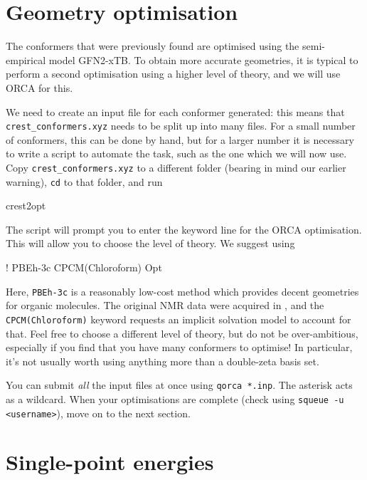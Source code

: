 \documentclass[10pt]{article}
\begin{document}
\section{Geometry optimisation}

The conformers that were previously found are optimised using the semi-empirical model GFN2-xTB.\autocite{Bannwarth2019} To obtain more accurate geometries, it is typical to perform a second optimisation using a higher level of theory, and we will use ORCA for this.

We need to create an input file for each conformer generated: this means that \texttt{crest\_conformers.xyz} needs to be split up into many files. For a small number of conformers, this can be done by hand, but for a larger number it is necessary to write a script to automate the task, such as the one which we will now use. Copy \texttt{crest\_conformers.xyz} to a different folder (bearing in mind our earlier warning), \texttt{cd} to that folder, and run

\begin{cmdline}
crest2opt
\end{cmdline}

The script will prompt you to enter the keyword line for the ORCA optimisation. This will allow you to choose the level of theory. We suggest using 

\begin{cmdline}
! PBEh-3c CPCM(Chloroform) Opt
\end{cmdline}

Here, \texttt{PBEh-3c} is a reasonably low-cost method which provides decent geometries for organic molecules. The original NMR data\autocite{Sun2013} were acquired in , and the \texttt{CPCM(Chloroform)} keyword requests an implicit solvation model to account for that. Feel free to choose a different level of theory, but do not be over-ambitious, especially if you find that you have many conformers to optimise! In particular, it's not usually worth using anything more than a double-zeta basis set.

You can submit \textit{all} the input files at once using \texttt{qorca *.inp}. The asterisk acts as a wildcard. When your optimisations are complete (check using \texttt{squeue -u <username>}), move on to the next section.


\section{Single-point energies}
\end{document}
